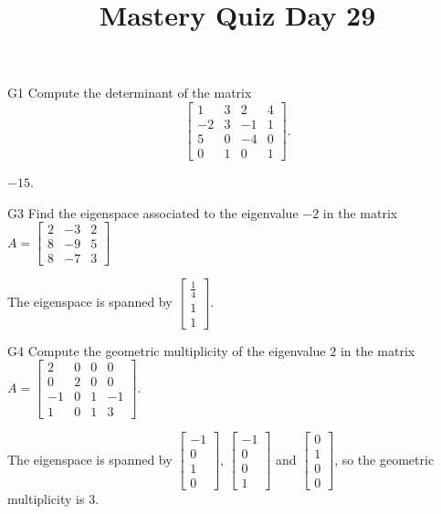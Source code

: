 \documentclass{sbgLAquiz}
\title{Mastery Quiz Day 29 }
\begin{document}
\begin{problem}{G1}
Compute the determinant of the matrix
\[
  \begin{bmatrix}
    1 & 3 & 2 & 4 \\
    -2 & 3 & -1 & 1 \\
    5 & 0 & -4 & 0 \\
    0 & 1 & 0 & 1
  \end{bmatrix}
.\]
\end{problem}
\begin{solution}
\(-15\).
\end{solution}

\begin{problem}{G3}
Find the eigenspace associated to the eigenvalue $-2$ in the matrix $A=\begin{bmatrix}2 & -3 & 2 \\ 8 & -9 & 5 \\ 8 & -7 & 3\end{bmatrix}$
\end{problem}
\begin{solution}
The eigenspace is spanned by $\begin{bmatrix} \frac{1}{4} \\ 1 \\ 1 \end{bmatrix}$.
\end{solution}


\begin{extract}\newpage\end{extract}
\begin{problem}{G4}
Compute the geometric multiplicity of the eigenvalue $2$ in the matrix $A=\begin{bmatrix} 2 & 0 & 0 & 0 \\ 0 & 2 & 0 & 0 \\ -1 & 0 & 1 & -1 \\ 1 & 0 & 1 & 3 \end{bmatrix}$.
\end{problem}
\begin{solution}
The eigenspace is spanned by $\begin{bmatrix} -1 \\ 0 \\ 1 \\ 0 \end{bmatrix}$, $\begin{bmatrix} -1 \\ 0 \\ 0 \\ 1 \end{bmatrix}$ and $\begin{bmatrix} 0 \\ 1 \\ 0 \\ 0 \end{bmatrix}$, so the geometric multiplicity is $3$.
\end{solution}
\end{document}
